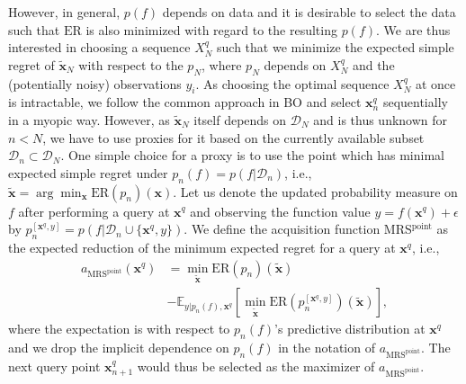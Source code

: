 \documentclass[10pt,letterpaper]{article} %
\begin{document}
However, in general, $p(f)$ depends on data and it is desirable to select the data such
that $\text{ER}$ is also minimized with regard to the resulting $p(f)$.
We are thus interested in choosing a
sequence $X^q_N$ such that we minimize the expected simple regret of $\mathbf{\tilde x}_N$ with respect to the $p_N$, where $p_N$ depends on $X^q_N$ and the (potentially noisy) observations $y_i$.
As choosing the optimal sequence $X^q_N$ at once is intractable, we follow the
common approach in BO and select $\mathbf{x}^q_n$
sequentially in a myopic way. However, as $\mathbf{\tilde x}_N$ itself depends
on $\mathcal{D}_N$ and is thus unknown for $n < N$, we have to use proxies for it based on the currently
available subset $\mathcal{D}_n \subset \mathcal{D}_N$.  One simple choice for a proxy is to use
the point which has minimal expected simple regret under $p_n(f) =
p(f \vert \mathcal{D}_n)$, i.e.,
$\mathbf{\tilde x} = \arg\min_\mathbf{x} \text{ER}(p_n)(\mathbf{x})$.
Let us denote the updated
probability measure on $f$ after performing a query at $\mathbf{x}^q$ and
observing the function value $y=f(\mathbf{x}^q) + \epsilon$ by
$p^{[\mathbf{x}^q, y]}_n = p(f\vert \mathcal{D}_n \cup \{\mathbf{x}^q, y\})$.
We define the acquisition function MRS$^{\text{point}}$ as the expected reduction of the minimum expected regret for a query at
$\mathbf{x}^q$, i.e.,
\begin{equation*}
\begin{split}
a_{\text{MRS}^{\text{point}}}(\mathbf{x}^q)
	& = \min_{\mathbf{\tilde x}}\text{ER}(p_n)(\mathbf{\tilde x}) \\
	 &- \mathbb{E}_{y \vert p_n(f), \mathbf{x}^q}[\min_{\mathbf{\tilde x}}  \text{ER}(p^{[\mathbf{x}^q, y]}_n)(\mathbf{\tilde x})],
\end{split}
\end{equation*}
where the expectation is with
respect to $p_n(f)$'s predictive distribution at $\mathbf{x}^q$ and we drop the
implicit dependence on $p_n(f)$ in the notation of $a_{\text{MRS}^{\text{point}}}$.
The next query point $\mathbf{x}^q_{n+1}$ would thus be selected as the maximizer of
$a_{\text{MRS}^{\text{point}}}$.
\end{document}
